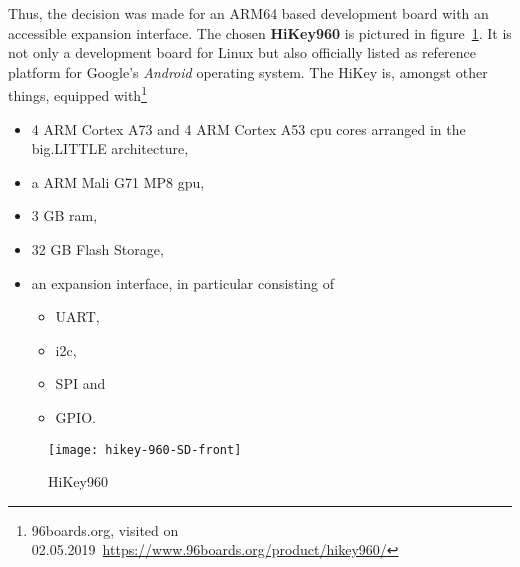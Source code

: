 Thus, the decision was made for an ARM64 based development board with an accessible expansion interface.
The chosen \textbf{HiKey960} is pictured in figure~\ref{pic:hikey}.
It is not only a development board for Linux but also officially listed as reference platform for Google's \textit{Android} operating system.
The HiKey is, amongst other things, equipped with\footnote{96boards.org, visited on 02.05.2019~\url{https://www.96boards.org/product/hikey960/}}
\begin{itemize}
    \item 4 ARM Cortex A73 and 4 ARM Cortex A53 \ac{cpu} cores arranged in the big.LITTLE architecture,
    \item a ARM Mali G71 MP8 \ac{gpu},
    \item 3 GB \ac{ram},
    \item 32 GB Flash Storage,
    \item an expansion interface, in particular consisting of
        \begin{itemize}
            \item UART,
            \item \ac{i2c},
            \item SPI and
            \item GPIO.
        \end{itemize}
\end{itemize}

\begin{figure} [t]
    \centering
    \texttt{[image: hikey-960-SD-front]}
    \caption{HiKey960}\label{pic:hikey}
\end{figure}

